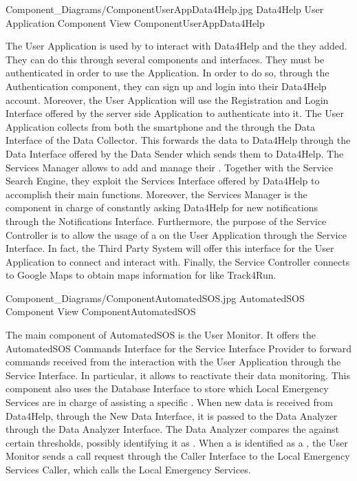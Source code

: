 \documentclass[../../DD.tex]{subfiles}
\begin{document}
	\image {13cm} {Component_Diagrams/ComponentUserAppData4Help.jpg} {Data4Help User Application Component View} {ComponentUserAppData4Help}

	The User Application is used by  to interact with Data4Help and the  they added. They can do this through several components and interfaces. They must be authenticated in order to use the Application. In order to do so, through the Authentication component, they can sign up and login into their Data4Help account. Moreover, the User Application will use the Registration and Login Interface offered by the server side Application to authenticate into it.
	The User Application collects  from both the smartphone and the  through the Data Interface of the Data Collector. This forwards the data to Data4Help through the Data Interface offered by the Data Sender which sends them to Data4Help.
	The Services Manager allows  to add and manage their . Together with the Service Search Engine, they exploit the Services Interface offered by Data4Help to accomplish their main functions. Moreover, the Services Manager is the component in charge of constantly asking Data4Help for new notifications through the Notifications Interface.
	Furthermore, the purpose of the Service Controller is to allow the usage of a  on the User Application through the Service Interface. In fact, the Third Party System will offer this interface for the User Application to connect and interact with. Finally, the Service Controller connects to Google Maps to obtain maps information for  like Track4Run.

	\image {13cm} {Component_Diagrams/ComponentAutomatedSOS.jpg} {AutomatedSOS Component View} {ComponentAutomatedSOS}

	The main component of AutomatedSOS is the User Monitor. It offers the AutomatedSOS Commands Interface for the Service Interface Provider to forward commands received from the interaction with the User Application through the Service Interface. In particular, it allows  to reactivate their data monitoring. This component also uses the Database Interface to store which Local Emergency Services are in charge of assisting a specific .
	When new data is received from Data4Help, through the New Data Interface, it is passed to the Data Analyzer through the Data Analyzer Interface. The Data Analyzer compares the  against certain thresholds, possibly identifying it as . When a  is identified as a , the User Monitor sends a call request through the Caller Interface to the Local Emergency Services Caller, which calls the Local Emergency Services.
\end{document}
